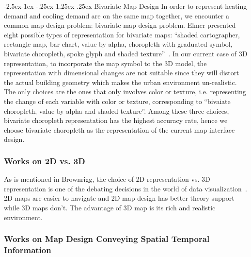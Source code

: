 \documentclass[hidelinks,12pt]{article}
\makeatletter
\renewcommand\paragraph{\@startsection{paragraph}{4}{\z@}%
            {-2.5ex\@plus -1ex \@minus -.25ex}%
            {1.25ex \@plus .25ex}%
            {\normalfont\normalsize\bfseries}}
\makeatother
\begin{document}
\paragraph{Bivariate Map Design} \label{bivariate}
In order to represent heating demand and cooling demand are on the
same map together, we encounter a common map design problem: bivariate
map design problem. Elmer presented eight possible types of
representation for bivariate maps: ``shaded cartographer, rectangle map,
bar chart, value by alpha, choropleth with graduated symbol, bivariate
choropleth, spoke glyph and shaded texture''~\cite{Elmer2012}. In our
current case of 3D representation, to incorporate the map symbol to
the 3D model, the representation with dimensional changes are not
suitable since they will distort the actual building geometry which
makes the urban environment un-realistic. The only choices are the
ones that only involves color or texture, i.e. representing the change
of each variable with color or texture, corresponding to ``bivaiate
choropleth, value by alpha and shaded texture''. Among these three
choices, bivariate choropleth representation has the highest accuracy
rate, hence we choose bivariate choropleth as the representation of
the current map interface design.

\subsubsection{Works on 2D vs. 3D} \label{2d3d} As is mentioned in
Brownrigg, the choice of 2D representation vs. 3D representation is
one of the debating decisions in the world of data
visualization~\cite{Brownrigg2005}. 2D maps are easier to navigate and
2D map design has better theory support while 3D maps don't. The
advantage of 3D map is its rich and realistic environment.

\subsubsection{Works on Map Design Conveying Spatial Temporal
  Information}
\end{document}
